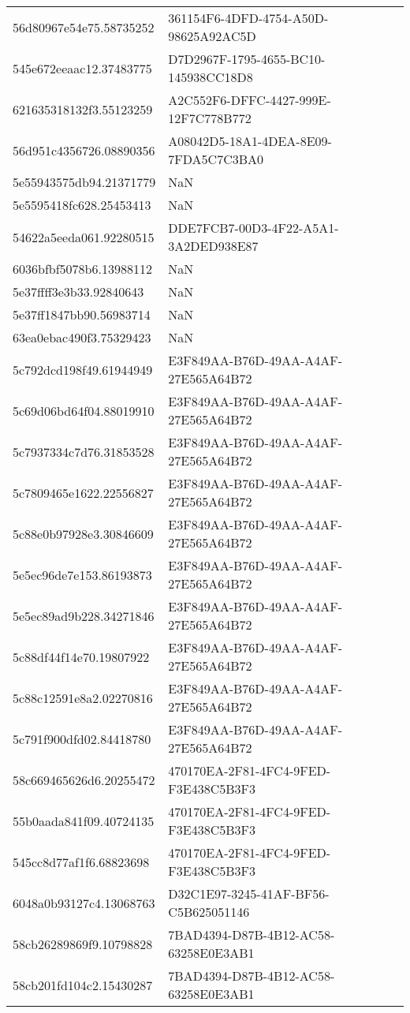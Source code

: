 \begin{tabular}{ll}
56d80967e54e75.58735252 & 361154F6-4DFD-4754-A50D-98625A92AC5D \\
545e672eeaac12.37483775 & D7D2967F-1795-4655-BC10-145938CC18D8 \\
621635318132f3.55123259 & A2C552F6-DFFC-4427-999E-12F7C778B772 \\
56d951c4356726.08890356 & A08042D5-18A1-4DEA-8E09-7FDA5C7C3BA0 \\
5e55943575db94.21371779 & NaN \\
5e5595418fc628.25453413 & NaN \\
54622a5eeda061.92280515 & DDE7FCB7-00D3-4F22-A5A1-3A2DED938E87 \\
6036bfbf5078b6.13988112 & NaN \\
5e37ffff3e3b33.92840643 & NaN \\
5e37ff1847bb90.56983714 & NaN \\
63ea0ebac490f3.75329423 & NaN \\
5c792dcd198f49.61944949 & E3F849AA-B76D-49AA-A4AF-27E565A64B72 \\
5c69d06bd64f04.88019910 & E3F849AA-B76D-49AA-A4AF-27E565A64B72 \\
5c7937334c7d76.31853528 & E3F849AA-B76D-49AA-A4AF-27E565A64B72 \\
5c7809465e1622.22556827 & E3F849AA-B76D-49AA-A4AF-27E565A64B72 \\
5c88e0b97928e3.30846609 & E3F849AA-B76D-49AA-A4AF-27E565A64B72 \\
5e5ec96de7e153.86193873 & E3F849AA-B76D-49AA-A4AF-27E565A64B72 \\
5e5ec89ad9b228.34271846 & E3F849AA-B76D-49AA-A4AF-27E565A64B72 \\
5c88df44f14e70.19807922 & E3F849AA-B76D-49AA-A4AF-27E565A64B72 \\
5c88c12591e8a2.02270816 & E3F849AA-B76D-49AA-A4AF-27E565A64B72 \\
5c791f900dfd02.84418780 & E3F849AA-B76D-49AA-A4AF-27E565A64B72 \\
58c669465626d6.20255472 & 470170EA-2F81-4FC4-9FED-F3E438C5B3F3 \\
55b0aada841f09.40724135 & 470170EA-2F81-4FC4-9FED-F3E438C5B3F3 \\
545cc8d77af1f6.68823698 & 470170EA-2F81-4FC4-9FED-F3E438C5B3F3 \\
6048a0b93127c4.13068763 & D32C1E97-3245-41AF-BF56-C5B625051146 \\
58cb26289869f9.10798828 & 7BAD4394-D87B-4B12-AC58-63258E0E3AB1 \\
58cb201fd104c2.15430287 & 7BAD4394-D87B-4B12-AC58-63258E0E3AB1 \\

\end{tabular}
